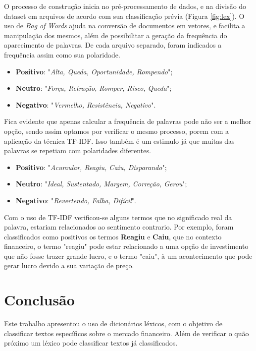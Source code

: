 \documentclass[conference]{IEEEtran}
\begin{document}
O processo de construção inicia no pré-processamento de dados, e na divisão do dataset em arquivos de acordo com sua classificação prévia (Figura \ref{fig:lex}). O uso de \textit{Bag of Words} ajuda na conversão de documentos em vetores, e facilita a manipulação dos mesmos, além de possibilitar a geração da frequência do aparecimento de palavras. De cada arquivo separado, foram indicados a frequência assim como sua polaridade.

\begin{itemize}
    \item \textbf{Positivo}: "\textit{Alta, Queda, Oportunidade, Rompendo}";
    \item \textbf{Neutro}: "\textit{Força, Retração, Romper, Risco, Queda}";
    \item \textbf{Negativo}: "\textit{Vermelho, Resistência, Negativo}".
\end{itemize}

Fica evidente que apenas calcular a frequência de palavras pode não ser a melhor opção, sendo assim optamos por verificar o mesmo processo, porem com a aplicação da técnica TF-IDF. Isso também é um estimulo já que muitas das palavras se repetiam com polaridades diferentes. 

\begin{itemize}
    \item \textbf{Positivo}: "\textit{Acumular, Reagiu, Caiu, Disparando}";
    \item \textbf{Neutro}: "\textit{Ideal, Sustentado, Margem, Correção, Gerou}";
    \item \textbf{Negativo}: "\textit{Revertendo, Falha, Difícil}".
\end{itemize}

Com o uso de TF-IDF verificou-se alguns termos que no significado real da palavra, estariam relacionados ao sentimento contrario. Por exemplo, foram classificados como positivos os termos \textbf{Reagiu} e \textbf{Caiu}, que no contexto financeiro, o termo "reagiu" pode estar relacionado a uma opção de investimento que não fosse trazer grande lucro, e o termo "caiu", à um acontecimento que pode gerar lucro devido a sua variação de preço. 


\section{Conclusão}

Este trabalho apresentou o uso de dicionários léxicos, com o objetivo de classificar textos específicos sobre o mercado financeiro. Além de verificar o quão próximo um léxico pode classificar textos já classificados. 
\end{document}
